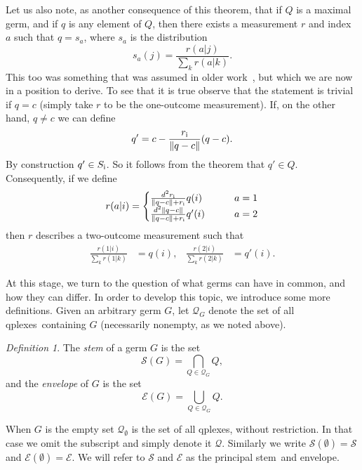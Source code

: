 \documentclass[aps,pra,superscriptaddress,10pt,tightenlines,twocolumn,nofootinbib]{revtex4}
\theoremstyle{remark}
\newtheorem{definition}{Definition}
\newcommand{\be}{\begin{equation}}
\newcommand{\ee}{\end{equation}}
\newcommand{\ea}[1]{\begin{align}#1\end{align}}
\newcommand{\si}{S_{\rm{i}}}
\newcommand{\ri}{r_{\rm{i}}}
\newcommand{\allqplexes}{\mathcal{Q}}
\newcommand{\stem}{stem}
\newcommand{\envelope}{envelope}
\newcommand{\qp}{Q}
\newcommand{\pr}{G}
\newcommand{\qplexes}{qplexes}
\newcommand{\stm}{\mathscr{S}}
\newcommand{\env}{\mathscr{E}}
\begin{document}
Let us also note, as another consequence of this theorem, that if $\qp$ is a maximal germ, and if $q$ is any element of $\qp$, then there exists a measurement $r$ and index $a$ such that $q=s_a$, where $s_a$ is the distribution
\begin{equation}
s_a(j) = \frac{r(a|j)}{\sum_k r(a|k)}.
\end{equation}
This too was something that was assumed in older work~\cite{fuchs2009, appleby2011, fuchs2013}, but which we are now in a position to derive. To see that it is true observe that the statement is trivial if $q=c$ (simply take $r$ to be the one-outcome measurement).  If, on the other hand,   $q\neq c$ we can define
\be
q' =  c-\frac{\ri}{\|q-c\|}(q-c).
\ee
By construction $q' \in \si$.  So it follows from the theorem that $q'\in \qp$.  Consequently, if we define
\ea{
r(a|i)
=
\begin{cases}
\frac{d^2\ri}{\|q-c\|+\ri} q(i) \qquad & a = 1
\\
\frac{d^2\|q-c\|}{\|q-c\|+\ri} q'(i) \qquad & a=2
\end{cases}
}
then $r$ describes a two-outcome measurement such that
\ea{
\frac{r(1|i)}{\sum_k r(1|k)} &= q(i), & \frac{r(2|i)}{\sum_k r(2|k)} &= q'(i).
}

At this stage, we turn to the question of what germs can have in common, and how they can differ.  In order to develop this topic, we introduce some more
definitions.  Given an arbitrary germ $\pr$, let $\allqplexes_\pr$ denote the set of all \qplexes\ containing $\pr$ (necessarily nonempty, as we noted above).

\begin{definition}
The \emph{stem} of a germ $\pr$ is the set
\begin{equation}
\stm(\pr) = \bigcap_{\qp \in \allqplexes_\pr} \qp,
\end{equation}
and the \emph{envelope} of $\pr$ is the set
\begin{equation}
\env(\pr) = \bigcup_{\qp \in \allqplexes_\pr} \qp.
\end{equation}
\end{definition}
When $\pr$ is the empty set  $\allqplexes_{\emptyset}$ is the set of all \qplexes, without restriction.  In that case we omit the subscript and simply denote it $\allqplexes$.  Similarly we write $\stm(\emptyset) = \stm$ and $\env(\emptyset) = \env$.  We will refer to $\stm$ and $\env$ as the principal \stem\ and \envelope.
\end{document}
